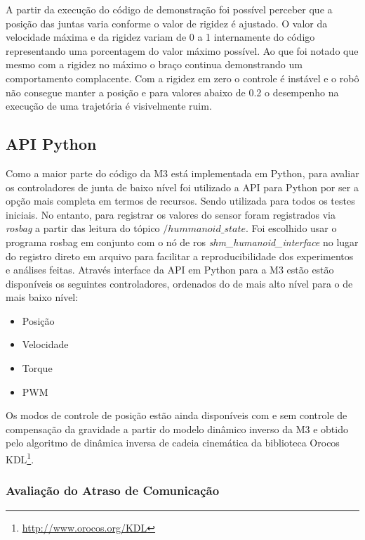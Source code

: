 A partir da execução do código de demonstração foi possível perceber que a posição das juntas varia conforme o valor de rigidez é ajustado. O valor da velocidade máxima e da rigidez variam de 0 a 1 internamente do código representando uma porcentagem do valor máximo possível. Ao que foi notado que mesmo com a rigidez no máximo o braço continua demonstrando um comportamento complacente. Com a rigidez em zero o controle é instável e o robô não consegue manter a posição e para valores abaixo de 0.2 o desempenho na execução de uma trajetória é visivelmente ruim.


\subsection{API Python}

Como a maior parte do código da M3 está implementada em Python, para avaliar os controladores de junta de baixo nível foi utilizado a API para Python por ser a opção mais completa em termos de recursos. Sendo utilizada para todos os testes iniciais. No entanto, para registrar os valores do sensor foram registrados via \textit{rosbag} a partir das leitura do tópico $/hummanoid\_state$. Foi escolhido usar o programa rosbag em conjunto com o nó de ros \textit{shm_humanoid_interface} no lugar do registro direto em arquivo para facilitar a reproducibilidade dos experimentos e análises feitas. Através interface da API em Python para a M3 estão estão disponíveis os seguintes controladores, ordenados do de mais alto nível para o de mais baixo nível:

\begin{itemize}
    \item Posição
    \item Velocidade
    \item Torque
    \item PWM
\end{itemize}

Os modos de controle de posição estão ainda disponíveis com e sem controle de compensação da gravidade a partir do modelo dinâmico inverso da M3 e obtido pelo algoritmo de dinâmica inversa de cadeia cinemática da biblioteca Orocos KDL\footnote{\url{http://www.orocos.org/KDL}}.

\subsubsection{Avaliação do Atraso de Comunicação}\label{subsec:deadtimepython}

